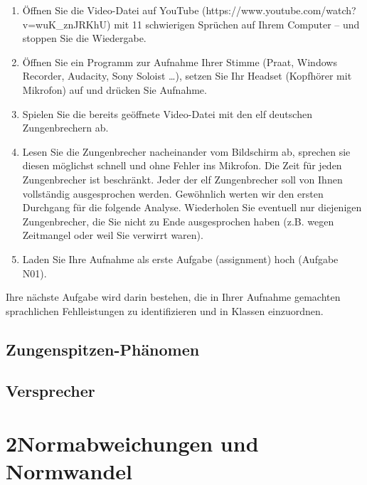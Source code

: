 \documentclass[
  letterpaper,
]{scrbook}
\providecommand{\tightlist}{%
  \setlength{\itemsep}{0pt}\setlength{\parskip}{0pt}}\usepackage{longtable,booktabs,array}
\begin{document}
\begin{enumerate}
\def\labelenumi{\arabic{enumi}.}
\tightlist
\item
  Öffnen Sie die Video-Datei auf YouTube
  (https://www.youtube.com/watch?v=wuK\_znJRKhU) mit 11 schwierigen
  Sprüchen auf Ihrem Computer -- und stoppen Sie die Wiedergabe.\\
\item
  Öffnen Sie ein Programm zur Aufnahme Ihrer Stimme (Praat, Windows
  Recorder, Audacity, Sony Soloist \ldots), setzen Sie Ihr Headset
  (Kopfhörer mit Mikrofon) auf und drücken Sie Aufnahme.\\
\item
  Spielen Sie die bereits geöffnete Video-Datei mit den elf deutschen
  Zungenbrechern ab.\\
\item
  Lesen Sie die Zungenbrecher nacheinander vom Bildschirm ab, sprechen
  sie diesen möglichst schnell und ohne Fehler ins Mikrofon. Die Zeit
  für jeden Zungenbrecher ist beschränkt. Jeder der elf Zungenbrecher
  soll von Ihnen vollständig ausgesprochen werden. Gewöhnlich werten wir
  den ersten Durchgang für die folgende Analyse. Wiederholen Sie
  eventuell nur diejenigen Zungenbrecher, die Sie nicht zu Ende
  ausgesprochen haben (z.B. wegen Zeitmangel oder weil Sie verwirrt
  waren).\\
\item
  Laden Sie Ihre Aufnahme als erste Aufgabe (assignment) hoch (Aufgabe
  N01).\\
\end{enumerate}

Ihre nächste Aufgabe wird darin bestehen, die in Ihrer Aufnahme
gemachten sprachlichen Fehlleistungen zu identifizieren und in Klassen
einzuordnen.

\hypertarget{sec-zungenspitze}{%
\chapter{Zungenspitzen-Phänomen}\label{sec-zungenspitze}}

\hypertarget{sec-versprecher}{%
\chapter{Versprecher}\label{sec-versprecher}}

\part{2Normabweichungen und Normwandel}
\end{document}
